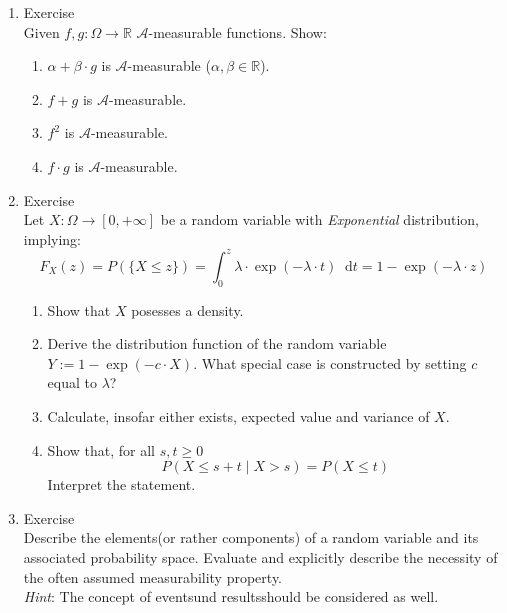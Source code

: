 \documentclass[12pt,a4paper]{article}
\newcommand*\diff{\mathop{}\!\mathrm{d}}
\begin{document}
\begin{enumerate}
\begin{enumerate}[label=(\roman*)]
\end{enumerate}

\item Exercise \\
Given $f, g: \Omega\to \mathbb{R}$ $\mathscr{A}$-measurable functions.  Show:
\begin{enumerate}[label=(\roman*)]

\item $\alpha + \beta \cdot g$ is $\mathscr{A}$-measurable ($\alpha, \beta \in \mathbb{R}$).

\item $f + g$ is $\mathscr{A}$-measurable.

\item $f ^2$ is $\mathscr{A}$-measurable.

\item $f \cdot g$ is $\mathscr{A}$-measurable.

\end{enumerate}

\item Exercise \\
Let $X: \Omega \to \left[ 0, + \infty \right]$ be a random variable with \textit{Exponential} distribution, implying:
\[
F_{X} (z) = P(\{ X \leq z\} ) = \int_0^z \lambda \cdot \exp(- \lambda \cdot t) \diff t = 1 - \exp (- \lambda \cdot z)
\]
\begin{enumerate}[label=(\roman*)]

\item Show that $X$ posesses a density.

\item Derive the distribution function of the random variable $Y:= 1 - \exp (-c \cdot X)$. What special case is constructed by setting $c$ equal to $\lambda$?

\item Calculate, insofar either exists, expected value and variance of $X$.

\item Show that, for all $s, t \geq 0$
\[
P(X \leq s + t \mid X > s) = P(X \leq t)
\]
Interpret the statement.

\end{enumerate}


\item Exercise \\
Describe the \glqq elements\grqq(or rather components) of a random variable and its associated probability space. Evaluate and explicitly describe the necessity of the often assumed measurability property.\\ \textit{Hint}: The concept of \glqq events\grqq und \glqq results\grqq should be considered as well.


\end{enumerate}
\end{document}
